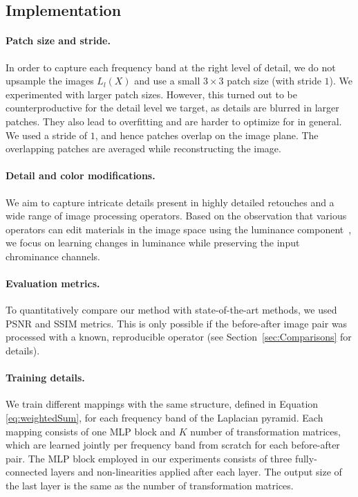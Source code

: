 
\subsection{Implementation}
\label{sec:Implementation}

\paragraph{Patch size and stride.} In order to capture each frequency band at the right level of detail, we do not upsample the images $L_l(X)$ and use a small $3 \times 3$ patch size (with stride $1$). We experimented with larger patch sizes. However, this turned out to be counterproductive for the detail level we target, as details are blurred in larger patches. They also lead to overfitting and are harder to optimize for in general. We used a stride of $1$, and hence patches overlap on the image plane. The overlapping patches are averaged while reconstructing the image.

\paragraph{Detail and color modifications.} We aim to capture intricate details present in highly detailed retouches and a wide range of image processing operators. Based on the observation that various operators can edit materials in the image space using the luminance component~\cite{Boyadzhiev15Band}, we focus on learning changes in luminance while preserving the input chrominance channels. 

\paragraph{Evaluation metrics.} To quantitatively compare our method with state-of-the-art methods, we used PSNR and SSIM metrics. This is only possible if the before-after image pair was processed with a known, reproducible operator (see Section~\ref{sec:Comparisons} for details).


\paragraph{Training details.}\label{train_det} We train different mappings with the same structure, defined in Equation \ref{eq:weightedSum}, for each frequency band of the Laplacian pyramid. Each mapping consists of one MLP block and $K$ number of transformation matrices, which are learned jointly per frequency band from scratch for each before-after pair. The MLP block employed in our experiments consists of three fully-connected layers and non-linearities applied after each layer. The output size of the last layer is the same as the number of transformation matrices.

